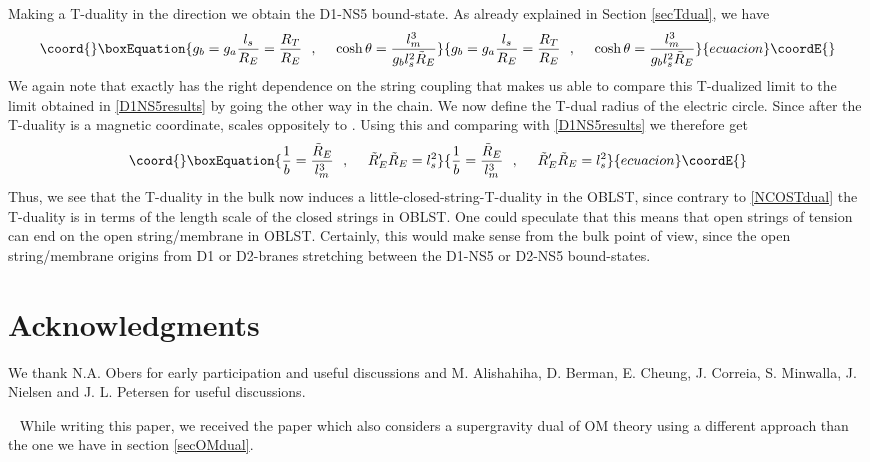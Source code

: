 \documentclass[a4paper,twoside,titlepage,12pt]{article}
\begin{document}
Making a T-duality in the \coordHE{} direction we obtain the D1-NS5 
bound-state. As already explained in Section \ref{secTdual}, we have
%
\begin{equation}\coord{}\boxEquation{
\gsnb = \gsna \frac{\lsn}{R_E} = \frac{R_T}{R_E} \spa
\cosh \theta = \frac{\lm^3}{\gsnb \lsn^2 \tilde{R}_E }
}{
\gsnb = \gsna \frac{\lsn}{R_E} = \frac{R_T}{R_E} \spa
\cosh \theta = \frac{\lm^3}{\gsnb \lsn^2 \tilde{R}_E }
}{ecuacion}\coordE{}\end{equation}
%
We again note that \myHighlight{$\cosh \theta$}\coordHE{} exactly has the right dependence
on the string coupling \myHighlight{$\gsnb$}\coordHE{} that makes us able to compare this
T-dualized limit to the limit obtained in \eqref{D1NS5results}
by going the other way in the chain.
We now define the T-dual radius \coordHE{} 
of the electric circle. Since \coordHE{} after the T-duality
is a magnetic coordinate, \coordHE{} scales oppositely to \coordHE{}.
Using this and comparing with \eqref{D1NS5results} we therefore get
%
\begin{equation}\coord{}\boxEquation{
\frac{1}{b} = \frac{\tilde{R}_E}{\lm^3} \spa
\tilde{R}'_E \tilde{R}_E = \lsn^2
}{
\frac{1}{b} = \frac{\tilde{R}_E}{\lm^3} \spa
\tilde{R}'_E \tilde{R}_E = \lsn^2
}{ecuacion}\coordE{}\end{equation}
%
Thus, we see that the T-duality in the bulk now induces a 
little-closed-string-T-duality in the OBLST, since contrary to
\eqref{NCOSTdual} the T-duality is in terms of the 
length scale \coordHE{} of the closed strings in OBLST.
One could speculate that this means that open strings of tension
\coordHE{} can end on the open string/membrane
in OBLST. 
Certainly, this would make sense from the bulk point of view, since
the open string/membrane origins from D1 or D2-branes stretching
between the D1-NS5 or D2-NS5 bound-states. 



\section*{Acknowledgments}

We thank N.A. Obers for early participation and useful discussions
and M. Alishahiha, D. Berman, E. Cheung, J. Correia, S. Minwalla, J. Nielsen 
and J. L. Petersen for useful discussions.

\  \newline
While writing this paper, we received the paper \cite{Berman:2000zw}
which also considers a supergravity dual of OM theory
using a different approach than the one we have in
section \ref{secOMdual}.
\end{document}
